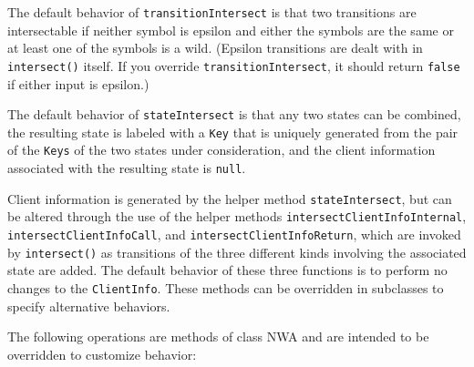The default behavior of
\texttt{transitionIntersect} is that two transitions are intersectable if
neither symbol is epsilon and either the symbols are the same or at least one of
the symbols is a wild. (Epsilon transitions are dealt with in
\texttt{intersect()} itself. If you override \texttt{transitionIntersect}, it
should return \texttt{false} if either input is epsilon.)

The default behavior of \texttt{stateIntersect} is that any two
states can be combined, the resulting state is labeled with a
\texttt{Key} that is uniquely generated from the pair of the \texttt{Keys} of
the two states under consideration, and the client information associated
with the resulting state is \texttt{null}.


Client information is generated by the helper method \texttt{stateIntersect},
but can be altered through the use of the helper methods
\texttt{intersectClientInfoInternal}, \texttt{intersectClientInfoCall}, and
\texttt{intersect\-Client\-InfoReturn}, which are invoked by
\texttt{intersect()} as transitions of the three different kinds involving the
associated state are added.  The default behavior of these three functions is
to perform no changes to the \texttt{ClientInfo}.  These methods can be
overridden in subclasses to specify alternative behaviors.

\goodbreak
\noindent The following operations are methods of class NWA and are intended
to be overridden to customize behavior:

